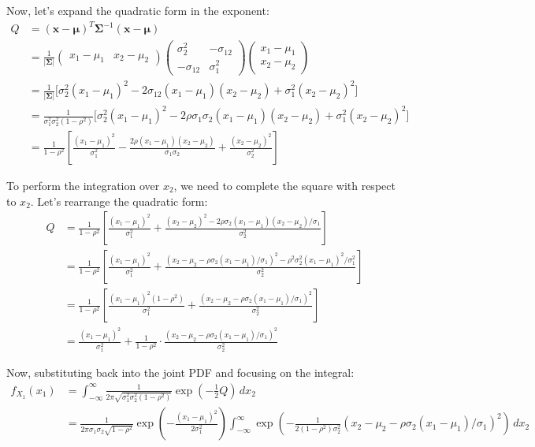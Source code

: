 \documentclass{article}
\begin{document}
Now, let's expand the quadratic form in the exponent:
\begin{align*}
Q &= (\mathbf{x}-\boldsymbol{\mu})^T \boldsymbol{\Sigma}^{-1} (\mathbf{x}-\boldsymbol{\mu})\\
&= \frac{1}{|\boldsymbol{\Sigma}|} \begin{pmatrix} x_1-\mu_1 & x_2-\mu_2 \end{pmatrix} \begin{pmatrix} \sigma_2^2 & -\sigma_{12} \\ -\sigma_{12} & \sigma_1^2 \end{pmatrix} \begin{pmatrix} x_1-\mu_1 \\ x_2-\mu_2 \end{pmatrix}\\
&= \frac{1}{|\boldsymbol{\Sigma}|} \Big[ \sigma_2^2(x_1-\mu_1)^2 - 2\sigma_{12}(x_1-\mu_1)(x_2-\mu_2) + \sigma_1^2(x_2-\mu_2)^2 \Big]\\
&= \frac{1}{\sigma_1^2\sigma_2^2(1-\rho^2)} \Big[ \sigma_2^2(x_1-\mu_1)^2 - 2\rho\sigma_1\sigma_2(x_1-\mu_1)(x_2-\mu_2) + \sigma_1^2(x_2-\mu_2)^2 \Big]\\
&= \frac{1}{1-\rho^2} \left[ \frac{(x_1-\mu_1)^2}{\sigma_1^2} - \frac{2\rho(x_1-\mu_1)(x_2-\mu_2)}{\sigma_1\sigma_2} + \frac{(x_2-\mu_2)^2}{\sigma_2^2} \right]
\end{align*}

To perform the integration over $x_2$, we need to complete the square with respect to $x_2$. Let's rearrange the quadratic form:
\begin{align*}
Q &= \frac{1}{1-\rho^2} \left[ \frac{(x_1-\mu_1)^2}{\sigma_1^2} + \frac{(x_2-\mu_2)^2 - 2\rho\sigma_2(x_1-\mu_1)(x_2-\mu_2)/\sigma_1}{\sigma_2^2} \right]\\
&= \frac{1}{1-\rho^2} \left[ \frac{(x_1-\mu_1)^2}{\sigma_1^2} + \frac{(x_2-\mu_2 - \rho\sigma_2(x_1-\mu_1)/\sigma_1)^2 - \rho^2\sigma_2^2(x_1-\mu_1)^2/\sigma_1^2}{\sigma_2^2} \right]\\
&= \frac{1}{1-\rho^2} \left[ \frac{(x_1-\mu_1)^2(1-\rho^2)}{\sigma_1^2} + \frac{(x_2-\mu_2 - \rho\sigma_2(x_1-\mu_1)/\sigma_1)^2}{\sigma_2^2} \right]\\
&= \frac{(x_1-\mu_1)^2}{\sigma_1^2} + \frac{1}{1-\rho^2} \cdot \frac{(x_2-\mu_2 - \rho\sigma_2(x_1-\mu_1)/\sigma_1)^2}{\sigma_2^2}
\end{align*}

Now, substituting back into the joint PDF and focusing on the integral:
\begin{align*}
f_{X_1}(x_1) &= \int_{-\infty}^{\infty} \frac{1}{2\pi\sqrt{\sigma_1^2\sigma_2^2(1-\rho^2)}} \exp\left(-\frac{1}{2}Q\right) \, dx_2\\
&= \frac{1}{2\pi\sigma_1\sigma_2\sqrt{1-\rho^2}} \exp\left(-\frac{(x_1-\mu_1)^2}{2\sigma_1^2}\right) \int_{-\infty}^{\infty} \exp\left(-\frac{1}{2(1-\rho^2)\sigma_2^2}(x_2-\mu_2 - \rho\sigma_2(x_1-\mu_1)/\sigma_1)^2\right) \, dx_2
\end{align*}
\end{document}
